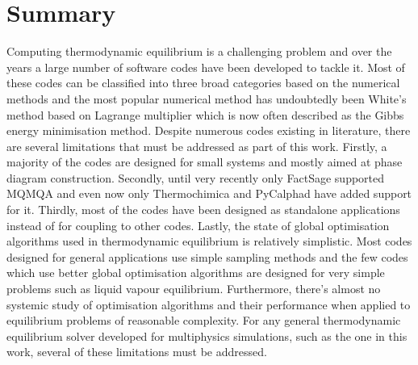 \section{Summary}
    Computing thermodynamic equilibrium is a challenging problem and over the years a large number of software codes have been developed to tackle it. Most of these codes can be classified into three broad categories based on the numerical methods and the most popular numerical method has undoubtedly been White's method based on Lagrange multiplier which is now often described as the Gibbs energy minimisation method. Despite numerous codes existing in literature, there are several limitations that must be addressed as part of this work. Firstly, a majority of the codes are designed for small systems and mostly aimed at phase diagram construction. Secondly, until very recently only FactSage supported MQMQA and even now only Thermochimica and PyCalphad have added support for it. Thirdly, most of the codes have been designed as standalone applications instead of for coupling to other codes. Lastly, the state of global optimisation algorithms used in thermodynamic equilibrium is relatively simplistic. Most codes designed for general applications use simple sampling methods and the few codes which use better global optimisation algorithms are designed for very simple problems such as liquid vapour equilibrium. Furthermore, there's almost no systemic study of optimisation algorithms and their performance when applied to equilibrium problems of reasonable complexity. For any general thermodynamic equilibrium solver developed for multiphysics simulations, such as the one in this work, several of these limitations must be addressed. 